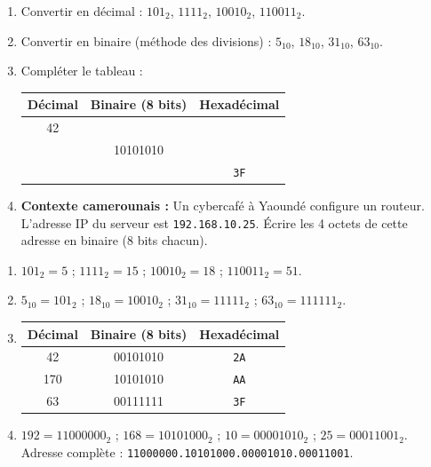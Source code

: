 \documentclass[11pt]{article}
\begin{document}
\begin{exercice}
\begin{enumerate}
    \item Convertir en décimal : $101_2$, $1111_2$, $10010_2$, $110011_2$.
    \item Convertir en binaire (méthode des divisions) : $5_{10}$, $18_{10}$, $31_{10}$, $63_{10}$.
    \item Compléter le tableau :
    \begin{center}
    \begin{tabular}{|c|c|c|}
    \hline
    Décimal & Binaire (8 bits) & Hexadécimal \\ \hline
    42      &                  &             \\ \hline
          & 10101010         &             \\ \hline
          &                  & \texttt{3F} \\ \hline
    \end{tabular}
    \end{center}
    \item \textbf{Contexte camerounais :} Un cybercafé à Yaoundé configure un routeur. L'adresse IP du serveur est \texttt{192.168.10.25}. Écrire les 4 octets de cette adresse en binaire (8 bits chacun).
\end{enumerate}
\end{exercice}

\begin{corrige}[Exercice n°1]
\begin{enumerate}
    \item $101_2 = 5$ ; $1111_2 = 15$ ; $10010_2 = 18$ ; $110011_2 = 51$.
    \item $5_{10} = 101_2$ ; $18_{10} = 10010_2$ ; $31_{10} = 11111_2$ ; $63_{10} = 111111_2$.
    \item
    \begin{center}
    \begin{tabular}{|c|c|c|}
    \hline
    Décimal & Binaire (8 bits) & Hexadécimal \\ \hline
    42      & 00101010         & \texttt{2A} \\ \hline
    170     & 10101010         & \texttt{AA} \\ \hline
    63      & 00111111         & \texttt{3F} \\ \hline
    \end{tabular}
    \end{center}
    \item $192 = 11000000_2$ ; $168 = 10101000_2$ ; $10 = 00001010_2$ ; $25 = 00011001_2$.
    Adresse complète : \texttt{11000000.10101000.00001010.00011001}.
\end{enumerate}
\end{corrige}
\end{document}

